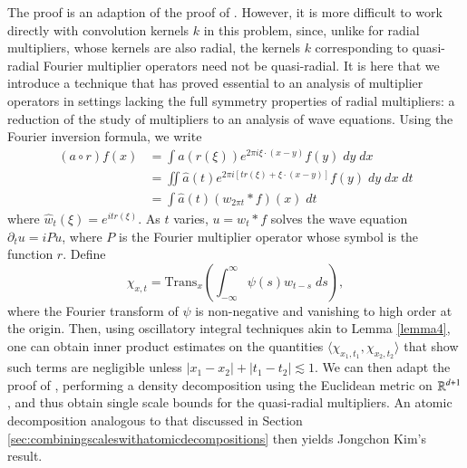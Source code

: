 The proof is an adaption of the proof of \cite{HeoandNazarovandSeeger2}. However, it is more difficult to work directly with convolution kernels $k$ in this problem, since, unlike for radial multipliers, whose kernels are also radial, the kernels $k$ corresponding to quasi-radial Fourier multiplier operators need not be quasi-radial. It is here that we introduce a technique that has proved essential to an analysis of multiplier operators in settings lacking the full symmetry properties of radial multipliers: a reduction of the study of multipliers to an analysis of wave equations. Using the Fourier inversion formula, we write
%
\begin{equation}
\begin{split}
  (a \circ r) f(x) &= \int a(r(\xi)) e^{2 \pi i \xi \cdot (x - y)} f(y)\; dy\; dx\\
  &= \iint \widehat{a}(t) e^{2 \pi i [t r(\xi) + \xi \cdot (x - y)]} f(y)\; dy\; dx\; dt\\
  &= \int \widehat{a}(t) (w_{2 \pi t} * f)(x)\; dt
\end{split}
\end{equation}
%
where $\widehat{w}_t(\xi) = e^{i t r(\xi)}$. As $t$ varies, $u = w_t * f$ solves the wave equation $\partial_t u = i P u$, where $P$ is the Fourier multiplier operator whose symbol is the function $r$. Define
%
\begin{equation}
  \chi_{x,t} = \text{Trans}_x \left( \int_{-\infty}^\infty \psi(s) w_{t - s}\; ds \right),
\end{equation}
%
where the Fourier transform of $\psi$ is non-negative and vanishing to high order at the origin. Then, using oscillatory integral techniques akin to Lemma \ref{lemma4}, one can obtain inner product estimates on the quantities $\langle \chi_{x_1,t_1}, \chi_{x_2,t_2} \rangle$ that show such terms are negligible unless $|x_1 - x_2| + |t_1 - t_2| \lesssim 1$. We can then adapt the proof of \cite{HeoandNazarovandSeeger2}, performing a density decomposition using the Euclidean metric on $\operatorname{\mathbb{R}}^{d+1}$, and thus obtain single scale bounds for the quasi-radial multipliers. An atomic decomposition analogous to that discussed in Section \ref{sec:combiningscaleswithatomicdecompositions} then yields Jongchon Kim's result.

